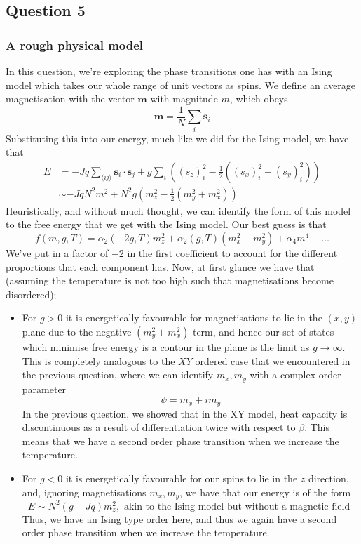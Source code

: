 \subsection{Question 5} 

\subsubsection*{A rough physical model} 
In this question, we're exploring the phase transitions one has with an Ising model which takes our whole range of unit vectors as spins. We define an average magnetisation with the vector $\mathbf{m} $ with magnitude $m$, which obeys 
\[ 
	\mathbf{ m }  = \frac{ 1}{N} \sum_i \mathbf{s}_i
\] Substituting this into our energy, much like we did for the Ising model, we have that 
\begin{align*} 
	E &= - Jq \sum_{ \langle ij \rangle} \mathbf{s}_i \cdot \mathbf{s}_j + g \sum_i \left( ( s_z )^2_i - \frac{ 1}{2} ( (s_x)^2_i + ( s_y)^2_i )  \right) \\
	& \sim - JqN^2m^2 + N^2  g \left( m_z^2 - \frac{1}{2} ( m_y^2 + m_x^2 ) \right) 
\end{align*} 
Heuristically, and without much thought, we can identify the form of this model to the free energy that we get with the Ising model. Our best guess is that 
\[ 
	f(m, g, T) = \alpha_2 (  - 2g, T ) m_z^2  + \alpha_2( g, T) (m_x^2 + m_y^2 ) + \alpha_4 m^4 + \dots 
\] 
We've put in a factor of $ - 2$ in the first coefficient to account for the different proportions that each component has. Now, at first glance we have that (assuming the temperature is not too high such that magnetisations become disordered); 
\begin{itemize} 
	\item For $g > 0$ it is energetically favourable for magnetisations to lie in the $( x, y)$ plane due to the negative $ ( m_y^2 + m_x^2 )$ term, and hence our set of states which minimise free energy is a contour in the plane is the limit as $g \rightarrow \infty$. This is completely analogous to the $XY$ ordered case that we encountered in the previous question, where we can identify $m_x, m_y$ with a complex order parameter 
	\[ 
		\psi = m_x + i m_y 
	\] In the previous question, we showed that in the XY model, heat capacity is discontinuous as a result of differentiation twice with respect to $\beta$. This means that we have a second order phase transition when we increase the temperature. 
	\item For $g  < 0$ it is energetically favourable for our spins to lie in the $z$ direction, and, ignoring magnetisations $m_x, m_y$, we have that our energy is of the form 
	\[ E \sim   N^2 ( g - Jq)m_z^2, \text{ akin to the Ising model but without a magnetic field } \] Thus, we have an Ising type order here, and thus we again have a second order phase transition when we increase the temperature. 
\end{itemize} 
